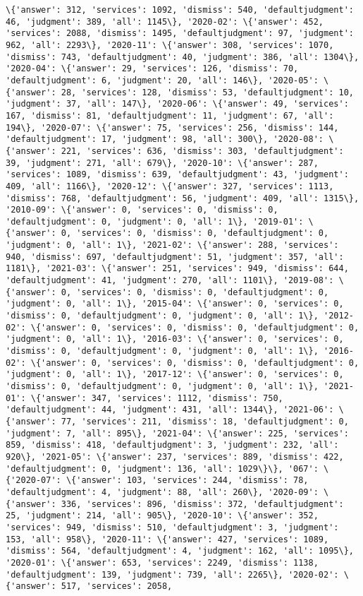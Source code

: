 \documentclass[11pt]{article}
\begin{document}
\begin{Verbatim}[commandchars=\\\{\}]
\{'answer': 312, 'services': 1092, 'dismiss': 540, 'defaultjudgment': 46, 'judgment': 389, 'all': 1145\}, '2020-02': \{'answer': 452, 'services': 2088, 'dismiss': 1495, 'defaultjudgment': 97, 'judgment': 962, 'all': 2293\}, '2020-11': \{'answer': 308, 'services': 1070, 'dismiss': 743, 'defaultjudgment': 40, 'judgment': 386, 'all': 1304\}, '2020-04': \{'answer': 29, 'services': 126, 'dismiss': 70, 'defaultjudgment': 6, 'judgment': 20, 'all': 146\}, '2020-05': \{'answer': 28, 'services': 128, 'dismiss': 53, 'defaultjudgment': 10, 'judgment': 37, 'all': 147\}, '2020-06': \{'answer': 49, 'services': 167, 'dismiss': 81, 'defaultjudgment': 11, 'judgment': 67, 'all': 194\}, '2020-07': \{'answer': 75, 'services': 256, 'dismiss': 144, 'defaultjudgment': 17, 'judgment': 98, 'all': 300\}, '2020-08': \{'answer': 221, 'services': 636, 'dismiss': 303, 'defaultjudgment': 39, 'judgment': 271, 'all': 679\}, '2020-10': \{'answer': 287, 'services': 1089, 'dismiss': 639, 'defaultjudgment': 43, 'judgment': 409, 'all': 1166\}, '2020-12': \{'answer': 327, 'services': 1113, 'dismiss': 768, 'defaultjudgment': 56, 'judgment': 409, 'all': 1315\}, '2010-09': \{'answer': 0, 'services': 0, 'dismiss': 0, 'defaultjudgment': 0, 'judgment': 0, 'all': 1\}, '2019-01': \{'answer': 0, 'services': 0, 'dismiss': 0, 'defaultjudgment': 0, 'judgment': 0, 'all': 1\}, '2021-02': \{'answer': 288, 'services': 940, 'dismiss': 697, 'defaultjudgment': 51, 'judgment': 357, 'all': 1181\}, '2021-03': \{'answer': 251, 'services': 949, 'dismiss': 644, 'defaultjudgment': 41, 'judgment': 270, 'all': 1101\}, '2019-08': \{'answer': 0, 'services': 0, 'dismiss': 0, 'defaultjudgment': 0, 'judgment': 0, 'all': 1\}, '2015-04': \{'answer': 0, 'services': 0, 'dismiss': 0, 'defaultjudgment': 0, 'judgment': 0, 'all': 1\}, '2012-02': \{'answer': 0, 'services': 0, 'dismiss': 0, 'defaultjudgment': 0, 'judgment': 0, 'all': 1\}, '2016-03': \{'answer': 0, 'services': 0, 'dismiss': 0, 'defaultjudgment': 0, 'judgment': 0, 'all': 1\}, '2016-02': \{'answer': 0, 'services': 0, 'dismiss': 0, 'defaultjudgment': 0, 'judgment': 0, 'all': 1\}, '2017-12': \{'answer': 0, 'services': 0, 'dismiss': 0, 'defaultjudgment': 0, 'judgment': 0, 'all': 1\}, '2021-01': \{'answer': 347, 'services': 1112, 'dismiss': 750, 'defaultjudgment': 44, 'judgment': 431, 'all': 1344\}, '2021-06': \{'answer': 77, 'services': 211, 'dismiss': 18, 'defaultjudgment': 0, 'judgment': 7, 'all': 895\}, '2021-04': \{'answer': 225, 'services': 859, 'dismiss': 418, 'defaultjudgment': 3, 'judgment': 232, 'all': 920\}, '2021-05': \{'answer': 237, 'services': 889, 'dismiss': 422, 'defaultjudgment': 0, 'judgment': 136, 'all': 1029\}\}, '067': \{'2020-07': \{'answer': 103, 'services': 244, 'dismiss': 78, 'defaultjudgment': 4, 'judgment': 88, 'all': 260\}, '2020-09': \{'answer': 336, 'services': 896, 'dismiss': 372, 'defaultjudgment': 25, 'judgment': 214, 'all': 905\}, '2020-10': \{'answer': 352, 'services': 949, 'dismiss': 510, 'defaultjudgment': 3, 'judgment': 153, 'all': 958\}, '2020-11': \{'answer': 427, 'services': 1089, 'dismiss': 564, 'defaultjudgment': 4, 'judgment': 162, 'all': 1095\}, '2020-01': \{'answer': 653, 'services': 2249, 'dismiss': 1138, 'defaultjudgment': 139, 'judgment': 739, 'all': 2265\}, '2020-02': \{'answer': 517, 'services': 2058, 
\end{Verbatim}
\end{document}
